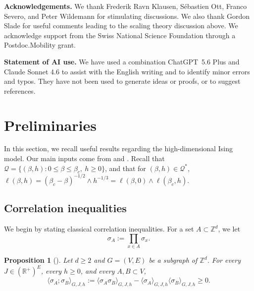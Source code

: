 \documentclass[10pt,a4paper]{amsart}
\numberwithin{equation}{section}
\newtheorem{Prop}[Thm]{Proposition}
\begin{document}
\hfill

\noindent \textbf{Acknowledgements.} We thank Frederik Ravn Klausen, S\'ebastien Ott, Franco Severo, and Peter Wildemann for stimulating discussions. We also thank Gordon Slade for useful comments leading to the scaling theory discussion above. We acknowledge support from the Swiss National Science Foundation through a Postdoc.Mobility grant.

\hfill

\noindent\textbf{Statement of AI use.} We have used a combination ChatGPT~5.6 Plus and Claude Sonnet 4.6 to assist with the English writing and to identify minor 
errors and typos. They have not been used to generate ideas or proofs, or to 
suggest references.


\section{Preliminaries}\label{sec:preliminaries}
In this section, we recall useful results regarding the high-dimensional Ising model. Our main inputs come from \cite{AizenmanFernandezCriticalBehaviorMagnetization1986} and \cite{DuminilPanis2024newLB}. Recall that $\mathcal Q=\{(\beta,h): 0\leq\beta\leq \beta_c,\: h\geq 0\}$, and that for $(\beta,h)\in \mathcal Q^*$, 
$\ell(\beta,h)=(\beta_c-\beta)^{-1/2}\wedge h^{-1/3}=\ell(\beta,0)\wedge \ell(\beta_c,h)$.

\subsection{Correlation inequalities}

We begin by stating classical correlation inequalities. For a set $A\subset \mathbb Z^d$, we let 
\begin{equation}
\sigma_A:=\prod_{x\in A}\sigma_x.
\end{equation} 

\begin{Prop}[]\label{prop:secondineqGriffiths} Let $d\geq 2$ and $G=(V,E)$ be a subgraph of $\mathbb Z^d$. For every $J\in (\mathbb R^+)^{E}$, every $h\geq 0$, and every $A,B\subset V$,
\begin{equation}
	\langle \sigma_A;\sigma_B\rangle_{G,J,h}:=\langle \sigma_A\sigma_B\rangle_{G,J,h}-\langle \sigma_A\rangle_{G,J,h}\langle \sigma_B\rangle_{G,J,h}
\geq 0.
\end{equation}
\end{Prop}
\end{document}
